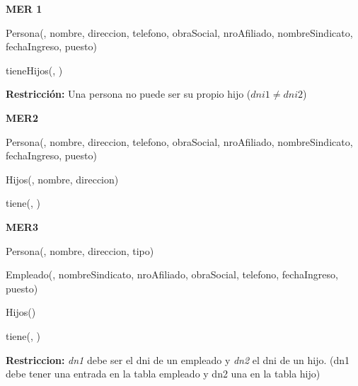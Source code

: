 
%
%


\begin{multicols}{2}
	
	\noindent\textbf{MER 1}
	
	\noindent Persona(, nombre, direccion, telefono, obraSocial, nroAfiliado, nombreSindicato, fechaIngreso, puesto)
	
	\noindent tieneHijos(, )
	
	\vspace*{0.5cm}
	\noindent\textbf{Restricción:} Una persona no puede ser su propio hijo ($dni1 \neq dni2$)
	\vspace*{1cm}
	
	\noindent\textbf{MER2}
	
	\noindent Persona(, nombre, direccion, telefono, obraSocial, nroAfiliado, nombreSindicato, fechaIngreso, puesto)
	
	\noindent Hijos(, nombre, direccion)
	
	\noindent tiene(, )
	
	\columnbreak
	\noindent\textbf{MER3}
	
	\noindent Persona(, nombre, direccion, tipo)
	
	\noindent Empleado(, nombreSindicato, nroAfiliado, obraSocial, telefono, fechaIngreso, puesto)
	
	\noindent Hijos()
	
	\noindent tiene(, )
	
	\vspace*{0.5cm}
	\noindent\textbf{Restriccion:} \textit{dn1} debe ser el dni de un empleado y \textit{dn2} el dni de un hijo. (dn1 debe tener una entrada en la tabla empleado y dn2 una en la tabla hijo)
\end{multicols}

